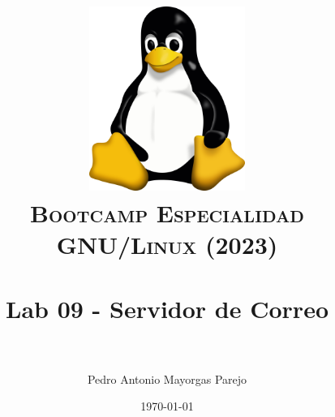 

\graphicspath{ {img/} }

\title{
\normalfont \normalsize
\includegraphics[width=6cm,height=6cm]{logo}\\
\textsc{\textbf{Bootcamp Especialidad GNU/Linux (2023)}} \\ [25pt] %
\horrule{0.5pt} \\[0.4cm] %
\huge Lab 09 - Servidor de Correo \\ %
\horrule{2pt} \\[0.5cm] %
}


\author{Pedro Antonio Mayorgas Parejo} %

\date{\normalsize\today} %




\maketitle %

\newpage %

\tableofcontents %

\newpage


